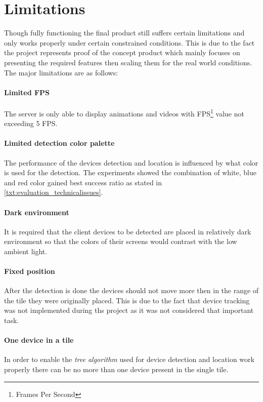 \section{Limitations}
Though fully functioning the final product still suffers certain limitations and only works properly under certain constrained conditions. This is due to the fact the project represents proof of the concept product which mainly focuses on presenting the required features then scaling them for the real world conditions. The major limitations are as follows:

\paragraph{Limited FPS} The server is only able to display animations and videos with FPS\footnote{Frames Per Second} value not exceeding 5 FPS.

\paragraph{Limited detection color palette} The performance of the devices detection and location is influenced by what color is used for the detection. The experiments showed the combination of white, blue and red color gained best success ratio as stated in \ref{txt:evaluation_technicalissues}.

\paragraph{Dark environment} It is required that the client devices to be detected are placed in relatively dark environment so that the colors of their screens would contrast with the low ambient light.

\paragraph{Fixed position} After the detection is done the devices should not move more then in the range of the tile they were originally placed. This is due to the fact that device tracking was not implemented during ths project as it was not considered that important task.

\paragraph{One device in a tile} In order to enable the \textit{tree algorithm} used for device detection and location work properly there can be no more than one device present in the single tile.

